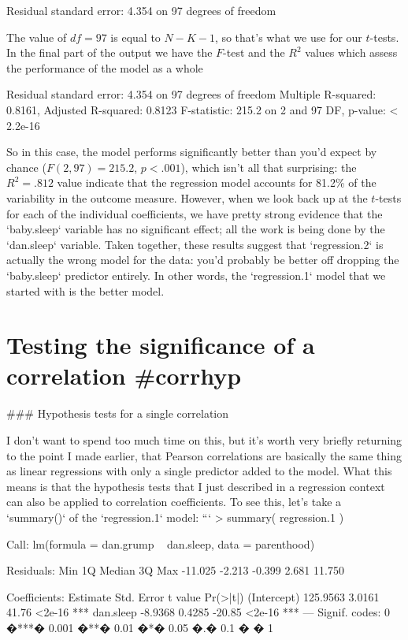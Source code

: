 \begin{rblock}
Residual standard error: 4.354 on 97 degrees of freedom
\end{rblock}
The value of $df = 97$ is equal to $N-K-1$, so that's what we use for our $t$-tests. In the final part of the output we have the $F$-test and the $R^2$ values which assess the performance of the model as a whole
\begin{rblock}
Residual standard error: 4.354 on 97 degrees of freedom
Multiple R-squared: 0.8161,	Adjusted R-squared: 0.8123 
F-statistic: 215.2 on 2 and 97 DF,  p-value: < 2.2e-16 
\end{rblock}
So in this case, the model performs significantly better than you'd expect by chance ($F(2,97) = 215.2$, $p<.001$), which isn't all that surprising: the $R^2 = .812$ value indicate that the regression model accounts for 81.2\% of the variability in the outcome measure. However, when we look back up at the $t$-tests for each of the individual coefficients, we have pretty strong evidence that the `baby.sleep` variable has no significant effect; all the work is being done by the `dan.sleep` variable. Taken together, these results suggest that `regression.2` is actually the wrong model for the data: you'd probably be better off dropping the `baby.sleep` predictor entirely. In other words, the `regression.1` model that we started with is the better model.


\section{Testing the significance of a correlation {#corrhyp}}


### Hypothesis tests for a single correlation

I don't want to spend too much time on this, but it's worth very briefly returning to the point I made earlier, that Pearson correlations are basically the same thing as linear regressions with only a single predictor added to the model. What this means is that the hypothesis tests that I just described in a regression context can also be applied to correlation coefficients. To see this, let's take a `summary()` of the `regression.1` model:
```
> summary( regression.1 )

Call:
lm(formula = dan.grump ~ dan.sleep, data = parenthood)

Residuals:
    Min      1Q  Median      3Q     Max 
-11.025  -2.213  -0.399   2.681  11.750 

Coefficients:
            Estimate Std. Error t value Pr(>|t|)    
(Intercept) 125.9563     3.0161   41.76   <2e-16 ***
dan.sleep    -8.9368     0.4285  -20.85   <2e-16 ***
---
Signif. codes:  0 �***� 0.001 �**� 0.01 �*� 0.05 �.� 0.1 � � 1 


